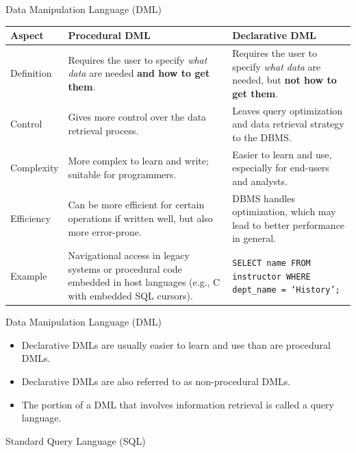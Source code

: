 \documentclass[aspectratio=169]{beamer}
\begin{document}
\begin{frame}{Data Manipulation Language (DML)}
    \centering
    \scriptsize
    \begin{tabular}{|p{1.5cm}|p{4cm}|p{4cm}|}
    \hline
    \textbf{Aspect} & \textbf{Procedural DML} & \textbf{Declarative DML} \\
    \hline
    Definition & Requires the user to specify \textit{what data} are needed \textbf{and how to get them}. & Requires the user to specify \textit{what data} are needed, but \textbf{not how to get them}. \\
    \hline
    Control & Gives more control over the data retrieval process. & Leaves query optimization and data retrieval strategy to the DBMS. \\
    \hline
    Complexity & More complex to learn and write; suitable for programmers. & Easier to learn and use, especially for end-users and analysts. \\
    \hline
    Efficiency & Can be more efficient for certain operations if written well, but also more error-prone. & DBMS handles optimization, which may lead to better performance in general. \\
    \hline
    Example & Navigational access in legacy systems or procedural code embedded in host languages (e.g., C with embedded SQL cursors). & \texttt{SELECT name FROM instructor WHERE dept\_name = `History';} \\
    \hline
    \end{tabular}
\end{frame}

\begin{frame}{Data Manipulation Language (DML)}
    \begin{itemize}
        \item Declarative DMLs are usually easier to learn and use than are procedural DMLs.
        \item Declarative DMLs are also referred to as non-procedural DMLs.
        \item The portion of a DML that involves information retrieval is called a query language.
    \end{itemize}
\end{frame}

\begin{frame}[fragile]{Standard Query Language (SQL)}
\end{frame}
\end{document}
